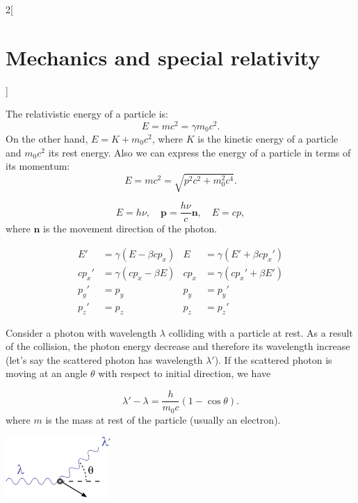 \documentclass[../../../main.tex]{subfiles}
\begin{document}
\begin{multicols}{2}[\section{Mechanics and special relativity}]
\begin{concept}
\end{concept}
\begin{concept}
The relativistic energy of a particle is: $$E=mc^2=\gamma m_0c^2.$$ On the other hand, $E=K+m_0c^2$, where $K$ is the kinetic energy of a particle and $m_0c^2$ its rest energy. Also we can express the energy of a particle in terms of its momentum:
$$E=mc^2=\sqrt{p^2c^2+m_0^2c^4}.$$
\end{concept}
\begin{concept}
$$E=h\nu,\quad\boldsymbol{p}=\frac{h\nu}{c}\boldsymbol{n},\quad E=cp,$$ where $\boldsymbol{n}$ is the movement direction of the photon.
\end{concept}
\begin{concept}
\begin{align*}
    E'&=\gamma(E-\beta cp_x) & E&=\gamma(E'+\beta cp_x')\\
    cp_x'&=\gamma(cp_x-\beta E) & cp_x&=\gamma(cp_x'+\beta E')\\
    p_y'&=p_y & p_y&=p_y'\\
    p_z'&=p_z & p_z&=p_z'
\end{align*}
\end{concept}
\begin{concept}
Consider a photon with wavelength $\lambda$ colliding with a particle at rest. As a result of the collision, the photon energy decrease and therefore its wavelength increase (let's say the scattered photon has wavelength $\lambda'$). If the scattered photon is moving at an angle $\theta$ with respect to initial direction, we have
\end{concept}
$$\lambda'-\lambda=\frac{h}{m_0c}(1-\cos\theta).$$
where $m$ is the mass at rest of the particle (usually an electron).
\begin{minipage}{\linewidth}
    \centering
    \includegraphics[width=4cm]{Physics/1st/Mechanics_and_special_relativity/Images/comp.jpg}
\end{minipage}

\end{multicols}
\end{document}
